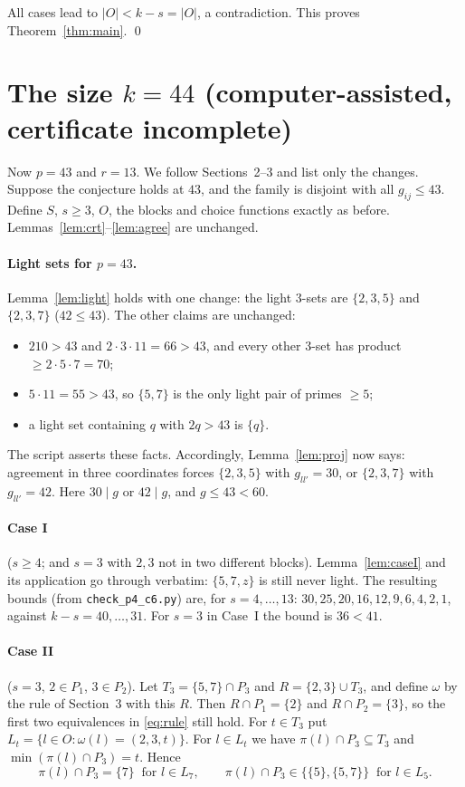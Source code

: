 \documentclass[11pt]{article}
\theoremstyle{definition}
\theoremstyle{remark}
\begin{document}
All cases lead to $|O|<k-s=|O|$, a contradiction. This proves Theorem~\ref{thm:main}. \qed

\section{The size $k=44$ (computer-assisted, certificate incomplete)}\label{sec:44}

Now $p=43$ and $r=13$. We follow Sections~2--3 and list only the changes. Suppose the conjecture
holds at $43$, and the family is disjoint with all $g_{ij}\le43$. Define $S$, $s\ge3$, $O$, the
blocks and choice functions exactly as before. Lemmas~\ref{lem:crt}--\ref{lem:agree} are unchanged.

\paragraph{Light sets for $p=43$.} Lemma~\ref{lem:light} holds with one change: the light
$3$-sets are $\{2,3,5\}$ and $\{2,3,7\}$ ($42\le43$). The other claims are unchanged:
\begin{itemize}
\item $210>43$ and $2\cdot3\cdot11=66>43$, and every other $3$-set has product $\ge2\cdot5\cdot7=70$;
\item $5\cdot11=55>43$, so $\{5,7\}$ is the only light pair of primes $\ge5$;
\item a light set containing $q$ with $2q>43$ is $\{q\}$.
\end{itemize}
The script asserts these facts. Accordingly, Lemma~\ref{lem:proj} now says: agreement in three
coordinates forces $\{2,3,5\}$ with $g_{ll'}=30$, or $\{2,3,7\}$ with $g_{ll'}=42$. Here $30\mid g$
or $42\mid g$, and $g\le43<60$.

\paragraph{Case I} ($s\ge4$; and $s=3$ with $2,3$ not in two different blocks).
Lemma~\ref{lem:caseI} and its application go through verbatim: $\{5,7,z\}$ is still never light.
The resulting bounds (from \texttt{check\_p4\_c6.py}) are, for $s=4,\dots,13$:
$30,25,20,16,12,9,6,4,2,1$, against $k-s=40,\dots,31$. For $s=3$ in Case~I the bound is $36<41$.

\paragraph{Case II} ($s=3$, $2\in P_1$, $3\in P_2$). Let $T_3=\{5,7\}\cap P_3$ and
$R=\{2,3\}\cup T_3$, and define $\omega$ by the rule of Section~3 with this $R$. Then
$R\cap P_1=\{2\}$ and $R\cap P_2=\{3\}$, so the first two equivalences in \eqref{eq:rule} still
hold. For $t\in T_3$ put $L_t=\{l\in O:\omega(l)=(2,3,t)\}$. For $l\in L_t$ we have
$\pi(l)\cap P_3\subseteq T_3$ and $\min(\pi(l)\cap P_3)=t$. Hence
\[
  \pi(l)\cap P_3=\{7\}\ \text{ for } l\in L_7,\qquad
  \pi(l)\cap P_3\in\bigl\{\{5\},\{5,7\}\bigr\}\ \text{ for } l\in L_5 .
\]
\end{document}
